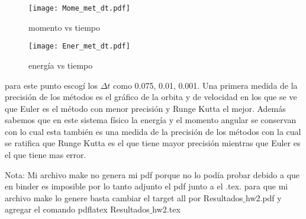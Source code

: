 \documentclass[12pt]{article}
\begin{document}
\begin{figure}[ht]
\texttt{[image: Mome\_met\_dt.pdf]}
\centering
\caption{momento vs tiempo}
\end{figure}
\begin{figure}[ht]
\texttt{[image: Ener\_met\_dt.pdf]}
\centering
\caption{energía vs tiempo}
\end{figure}
para este punto escogí los $\Delta t$ como 0.075, 0.01, 0.001. Una primera medida de la precisión de los métodos es el gráfico de la orbita y de velocidad en los que se ve que Euler es el método con menor precisión y Runge Kutta el mejor. Además sabemos que en este sistema físico la energía y el momento angular se conservan con lo cual esta también es una medida de la precisión de los métodos con la cual se ratifica que Runge Kutta es el que tiene mayor precisión mientras que Euler es el que tiene mas error. 

Nota: Mi archivo make no genera mi pdf porque no lo podía probar debido a que en binder es imposible por lo tanto adjunto el pdf junto a el .tex. para que mi archivo make lo genere basta cambiar el target all por Resultados$\_$hw2.pdf y agregar el comando pdflatex Resultados$\_$hw2.tex 
\end{document}
